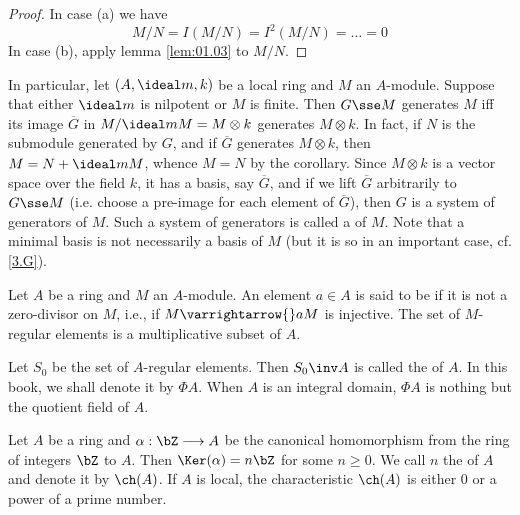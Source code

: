 \documentclass[../main]{subfiles}
\begin{document}
\begin{proof}
In case (a) we have
\[M/N = I(M/N) = I^2(M/N) = \ldots = 0\]
In case (b), apply lemma \ref{lem:01.03} to $M/N$.
\end{proof}

\newparagraph
In particular, let $(A,\ideal m,k)$ be a local ring and $M$ an $A$-module. Suppose that either $\ideal m$ is nilpotent or $M$ is finite. Then $G\sse M$ generates $M$ iff its image $\overline G$ in $M/\ideal mM=M\otimes k$ generates $M\otimes k$. In fact, if $N$ is the submodule generated by $G$, and if $\overline G$ generates $M\otimes k$, then $M=N+\ideal mM$, whence $M=N$ by the corollary. Since $M\otimes k$ is a vector space over the field $k$, it has a basis, say $\overline G$, and if we lift $\overline G$ arbitrarily to $G\sse M$ (i.e. choose a pre-image for each element of $\overline G$), then $G$ is a system of generators of $M$. Such a system of generators is called a  of $M$. Note that a minimal basis is not necessarily a basis of $M$ (but it is so in an important case, cf. \ref{3.G}).

\newparagraph
Let $A$ be a ring and $M$ an $A$-module. An element $a\in A$ is said to be  if it is not a zero-divisor on $M$, i.e., if $M\varrightarrow{} aM$ is injective. The set of $M$-regular elements is a multiplicative subset of $A$.

Let $S_0$ be the set of $A$-regular elements. Then $S_0\inv A$ is called the  of $A$. In this book, we shall denote it by $\Phi A$. When $A$ is an integral domain, $\Phi A$ is nothing but the quotient field of $A$.

\newparagraph
Let $A$ be a ring and $\alpha:\bZ\longrightarrow A$ be the canonical homomorphism from the ring of integers $\bZ$ to $A$. Then $\Ker(\alpha)=n\bZ$ for some $n\ge0$. We call $n$ the  of $A$ and denote it by $\ch(A)$. If $A$ is local, the characteristic $\ch(A)$ is either 0 or a power of a prime number.
\end{document}
